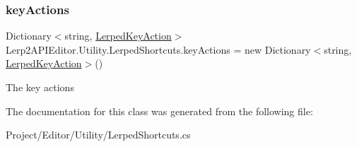 \subsubsection{\texorpdfstring{key\+Actions}{keyActions}}
{\footnotesize\ttfamily Dictionary$<$string, \hyperlink{class_lerp2_a_p_i_editor_1_1_utility_1_1_lerped_key_action}{Lerped\+Key\+Action}$>$ Lerp2\+A\+P\+I\+Editor.\+Utility.\+Lerped\+Shortcuts.\+key\+Actions = new Dictionary$<$string, \hyperlink{class_lerp2_a_p_i_editor_1_1_utility_1_1_lerped_key_action}{Lerped\+Key\+Action}$>$()\hspace{0.3cm}{\ttfamily [static]}}



The key actions 



The documentation for this class was generated from the following file\+:\begin{DoxyCompactItemize}
\item 
Project/\+Editor/\+Utility/Lerped\+Shortcuts.\+cs\end{DoxyCompactItemize}
